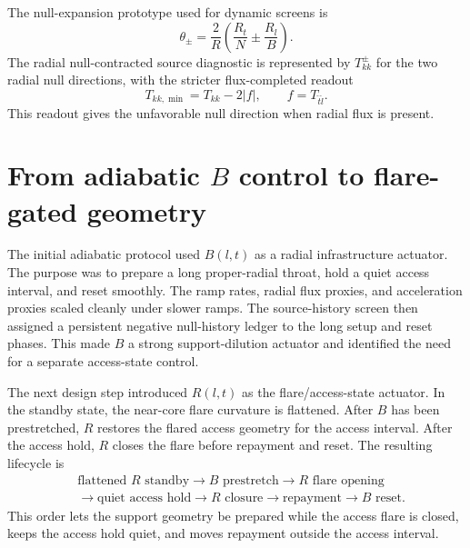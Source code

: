 \documentclass[11pt]{article}
\begin{document}
The null-expansion prototype used for dynamic screens is
\begin{equation}
 \theta_\pm=\frac{2}{R}\left(\frac{R_t}{N}\pm\frac{R_l}{B}\right).
 \label{eq:null_expansions}
\end{equation}
The radial null-contracted source diagnostic is represented by $T_{kk}^{\pm}$ for the two radial null directions, with the stricter flux-completed readout
\begin{equation}
 T_{kk,\min}=T_{kk}-2|f|,
 \qquad f=T_{\hat t\hat l}.
 \label{eq:flux_completed}
\end{equation}
This readout gives the unfavorable null direction when radial flux is present.

\section{From adiabatic $B$ control to flare-gated geometry}

The initial adiabatic protocol used $B(l,t)$ as a radial infrastructure actuator.  The purpose was to prepare a long proper-radial throat, hold a quiet access interval, and reset smoothly.  The ramp rates, radial flux proxies, and acceleration proxies scaled cleanly under slower ramps.  The source-history screen then assigned a persistent negative null-history ledger to the long setup and reset phases.  This made $B$ a strong support-dilution actuator and identified the need for a separate access-state control.

The next design step introduced $R(l,t)$ as the flare/access-state actuator.  In the standby state, the near-core flare curvature is flattened.  After $B$ has been prestretched, $R$ restores the flared access geometry for the access interval.  After the access hold, $R$ closes the flare before repayment and reset.  The resulting lifecycle is
\begin{equation}
\begin{aligned}
&\text{flattened }R\text{ standby}
\rightarrow B\text{ prestretch}
\rightarrow R\text{ flare opening}\\
&\rightarrow \text{quiet access hold}
\rightarrow R\text{ closure}
\rightarrow \text{repayment}
\rightarrow B\text{ reset}.
\end{aligned}
\label{eq:lifecycle_geom}
\end{equation}
This order lets the support geometry be prepared while the access flare is closed, keeps the access hold quiet, and moves repayment outside the access interval.
\end{document}
